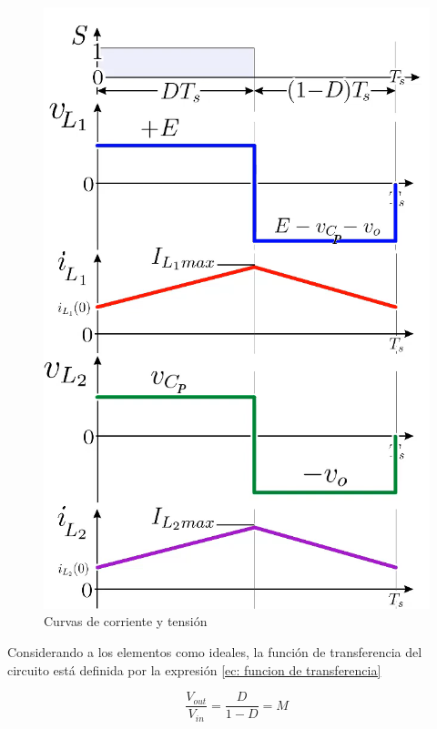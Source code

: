      \begin{figure}[htbp]
            \centering
             \includegraphics[scale = 0.25]{Figuras/curvas_BB.png}
            \caption{Curvas de corriente y tensión}
            \label{fig: Curvas IV}
      \end{figure}
  
    Considerando a los elementos como ideales, la función de transferencia del circuito está definida por la expresión \ref{ec: funcion de transferencia}
    
    \begin{equation}
        \frac{V_{out}}{V_{in}} = \frac{D}{1-D} = M 
        \label{ec: funcion de transferencia}
    \end{equation}
    
